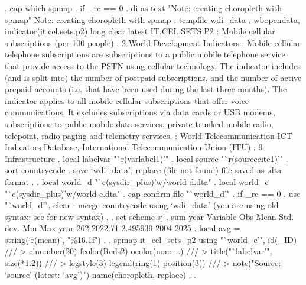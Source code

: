 . cap which spmap
{\smallskip}
. if _rc == 0 {\lbr}
.     di as text "Note: creating choropleth with spmap"
Note: creating choropleth with spmap
.     tempfile wdi_data
.     wbopendata, indicator(it.cel.sets.p2) long clear latest
{\smallskip}
    {} IT.CEL.SETS.P2
    {}: Mobile cellular subscriptions (per 100 people)
    {}: 2 World Development Indicators
    {}: Mobile cellular telephone subscriptions are subscriptions
    to a public mobile telephone service that provide access to the PSTN
    using cellular technology. The indicator includes (and is split into)
    the number of postpaid subscriptions, and the number of active prepaid
    accounts (i.e. that have been used during the last three months). The
    indicator applies to all mobile cellular subscriptions that offer voice
    communications. It excludes subscriptions via data cards or USB modems,
    subscriptions to public mobile data services, private trunked mobile
    radio, telepoint, radio paging and telemetry services.
    {}: World Telecommunication ICT Indicators Database, International
    Telecommunication Union (ITU)
    {}{}{\bftt{)}}: 9 Infrastructure
{\smallskip}
{\smallskip}
.     local labelvar "`r(varlabel1)'"
.     local source "`r(sourcecite1)'"
.     sort countrycode
.     save `wdi_data', replace
(file{} not found)
file{} saved as .dta
    format
. 
.     local world_d "`c(sysdir_plus)'w/world-d.dta"
.     local world_c "`c(sysdir_plus)'w/world-c.dta"
.     cap confirm file "`world_d'"
.     if _rc == 0 {\lbr}
.         use "`world_d'", clear
.         merge countrycode using `wdi_data'
(you are using old {} syntax; see {} for new syntax)
. 
.         set scheme sj
.         sum year
{\smallskip}
    Variable {\VBAR}        Obs        Mean    Std. dev.       Min        Max
        year {\VBAR}        262     2022.71    2.495939       2004       2025
.         local avg = string(`r(mean)', "\%16.1f")
. 
.         spmap it_cel_sets_p2 using "`world_c'", id(_ID) ///
>             clnumber(20) fcolor(Reds2) ocolor(none ..) ///
>             title("`labelvar'", size(*1.2)) ///
>             legstyle(3) legend(ring(1) position(3)) ///
>             note("Source: `source' (latest: `avg')") name(choropleth, replace)
.     {\rbr}
. {\rbr}
{\smallskip}
